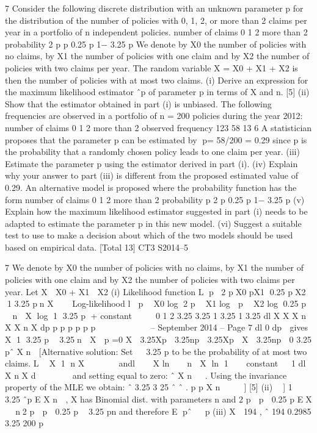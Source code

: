 \documentclass[a4paper,12pt]{article}
\begin{document}
\begin{enumerate}
7 Consider the following discrete distribution with an unknown parameter p for the
distribution of the number of policies with 0, 1, 2, or more than 2 claims per year in a
portfolio of n independent policies.
number of claims 0 1 2 more than 2
probability 2 p p 0.25 p 1− 3.25 p
We denote by X0 the number of policies with no claims, by X1 the number of policies
with one claim and by X2 the number of policies with two claims per year. The
random variable X = X0 + X1 + X2 is then the number of policies with at most two
claims.
(i) Derive an expression for the maximum likelihood estimator ˆp of parameter p
in terms of X and n. [5]
(ii) Show that the estimator obtained in part (i) is unbiased. 
The following frequencies are observed in a portfolio of n = 200 policies during the
year 2012:
  number of claims 0 1 2 more than 2
observed frequency 123 58 13 6
A statistician proposes that the parameter p can be estimated by 􀀄p= 58/200 = 0.29
since p is the probability that a randomly chosen policy leads to one claim per year.
(iii) Estimate the parameter p using the estimator derived in part (i). 
(iv) Explain why your answer to part (iii) is different from the proposed estimated
value of 0.29. 
An alternative model is proposed where the probability function has the form
number of claims 0 1 2 more than 2
probability p 2 p 0.25 p 1− 3.25 p
(v) Explain how the maximum likelihood estimator suggested in part (i) needs to
be adapted to estimate the parameter p in this new model. 
(vi) Suggest a suitable test to use to make a decision about which of the two
models should be used based on empirical data. 
[Total 13]
CT3 S2014–5 
\newpage


7 We denote by X0 the number of policies with no claims, by X1 the number of
policies with one claim and by X2 the number of policies with two claims per year.
Let X  X0 + X1  X2
(i) Likelihood function
L p 2 pX0 pX1 0.25 pX2 1 3.25 pn X   
Log-likelihood
l  p  X0 log 2 p  X1 log  p  X2 log 0.25 p  n  X log 1 3.25 p
+ constant
    0 1 2 3.25 3.25
1 3.25 1 3.25
dl X X X n X X n X
dp p p p p p p
 
     
 
 – September 2014 – %
Page 7
dl 0
dp
 gives X 1 3.25 p  3.25n  X  p =0
X  3.25Xp  3.25np  3.25Xp  X  3.25np  0
3.25
pˆ X
n

[Alternative solution:
   Set   3.25 p to be the probability of at most two claims.
 L  X 1 n X       andl   X ln  n  X ln 1   constant
  
 1
 dl X n X
 d
 
  
   
 and setting equal to zero: ˆ X
 n
   .
 Using the invariance property of the MLE we obtain:
   ˆ 3.25
 3 25
 ˆ ˆ
 .
 p p X
 n
     ] [5]
(ii) 􀜧􁈾 ] 1  
3.25
ˆp E X
n
 , X has Binomial dist. with parameters n and
2 p  p  0.25 p
EX   n2 p  p  0.25 p  3.25 pn
and therefore E pˆ   p 
(iii) X  194 , ˆ 194 0.2985
3.25 200
p 



\end{enumerate}
\end{document}
